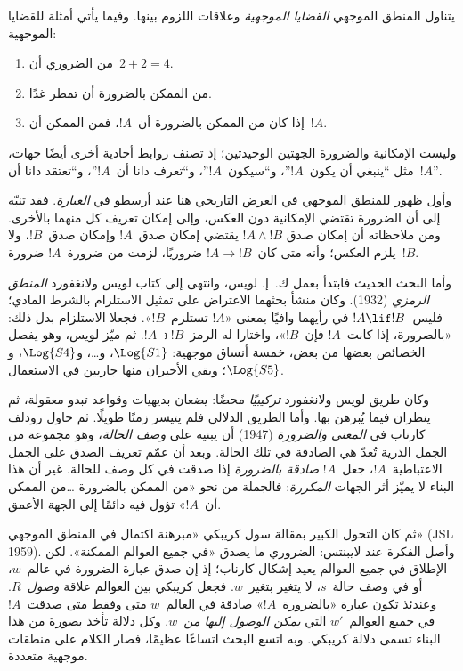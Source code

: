 \documentclass[../../../include/open-logic-section]{subfiles}
\begin{document}


يتناول المنطق الموجهي \emph{القضايا الموجهية} وعلاقات اللزوم بينها.
وفيما يأتي أمثلة للقضايا الموجهية:
\begin{enumerate}
\item من الضروري أن~$2+2=4$.
\item من الممكن بالضرورة أن تمطر غدًا.
\item إذا كان من الممكن بالضرورة أن~$!A$، فمن الممكن أن~$!A$.
\end{enumerate}
وليست الإمكانية والضرورة الجهتين الوحيدتين؛ إذ تصنف روابط أحادية أخرى
أيضًا جهات، مثل ``ينبغي أن يكون~$!A$''، و``سيكون~$!A$''، و``تعرف دانا
أن~$!A$''، و``تعتقد دانا أن~$!A$''.

وأول ظهور للمنطق الموجهي في العرض التاريخي هنا عند أرسطو في
\emph{العبارة}. فقد تنبّه إلى أن الضرورة تقتضي الإمكانية دون العكس،
وإلى إمكان تعريف كل منهما بالأخرى. ومن ملاحظاته أن إمكان صدق
$!A \land !B$ يقتضي إمكان صدق~$!A$ وإمكان صدق~$!B$، ولا يلزم
العكس؛ وأنه متى كان~$!A \to !B$ ضروريًا، لزمت من ضرورة~$!A$
ضرورة~$!B$.

وأما البحث الحديث فابتدأ بعمل ك.~إ. لويس، وانتهى إلى كتاب لويس
ولانغفورد \emph{المنطق الرمزي} (1932). وكان منشأ بحثهما الاعتراض على
تمثيل الاستلزام بالشرط المادي؛ فليس~$!A \lif !B$ في رأيهما وافيًا
بمعنى «$!A$ تستلزم~$!B$». فجعلا الاستلزام بدل ذلك: «بالضرورة،
إذا كانت~$!A$ فإن~$!B$»، واختارا له الرمز~$!A \strictif !B$.
ثم ميّز لويس، وهو يفصل الخصائص بعضها من بعض، خمسة أنساق موجهية:
$\Log{S1}$، و\ldots، و$\Log{S4}$، و$\Log{S5}$؛ وبقي الأخيران
منها جاريين في الاستعمال.

وكان طريق لويس ولانغفورد \emph{تركيبيًا} محضًا: يضعان بديهيات
وقواعد تبدو معقولة، ثم ينظران فيما يُبرهن بها. وأما الطريق الدلالي
فلم يتيسر زمنًا طويلًا. ثم حاول رودلف كارناب في \emph{المعنى والضرورة}
(1947) أن يبنيه على \emph{وصف الحالة}، وهو مجموعة من الجمل الذرية
تُعدّ هي الصادقة في تلك الحالة. وبعد أن عمّم تعريف الصدق على الجمل
الاعتباطية~$!A$، جعل~$!A$ \emph{صادقة بالضرورة} إذا صدقت في كل
وصف للحالة. غير أن هذا البناء لا يميّز أثر الجهات \emph{المكررة}:
فالجملة من نحو «من الممكن بالضرورة \ldots من الممكن أن~$!A$»
تؤول فيه دائمًا إلى الجهة الأعمق.

ثم كان التحول الكبير بمقالة سول كريبكي «مبرهنة اكتمال في المنطق
الموجهي» (JSL 1959). وأصل الفكرة عند لايبنتس: الضروري ما يصدق
«في جميع العوالم الممكنة». لكن الإطلاق في جميع العوالم يعيد إشكال
كارناب؛ إذ إن صدق عبارة الضرورة في عالم~$w$، أو في وصف حالة~$s$،
لا يتغير بتغير~$w$. فجعل كريبكي بين العوالم علاقة \emph{وصول}~$R$.
وعندئذ تكون عبارة «بالضرورة~$!A$» صادقة في العالم~$w$ متى وفقط
متى صدقت~$!A$ في جميع العوالم~$w'$ التي \emph{يمكن الوصول إليها
من}~$w$. وكل دلالة تأخذ بصورة من هذا البناء تسمى دلالة كريبكي.
وبه اتسع البحث اتساعًا عظيمًا، فصار الكلام على منطقات موجهية متعددة.
\end{document}
